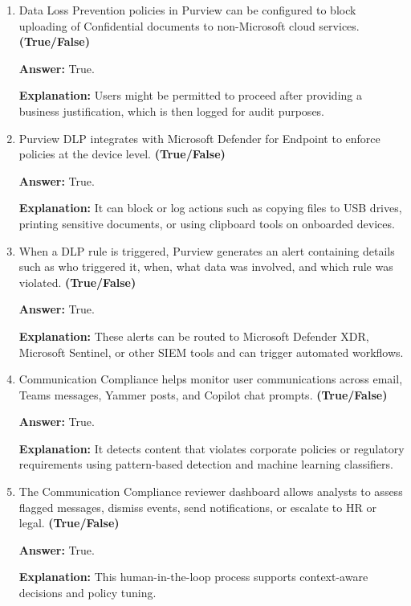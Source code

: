 \documentclass[10pt]{article}
\begin{document}
\begin{enumerate}[leftmargin=*]
\textbf{Answer:} True.

\textbf{Explanation:} The combination of HR context and data activity elevates risk scores and justifies further investigation during high-risk periods.

\item Data Loss Prevention policies in Purview can be configured to block uploading of Confidential documents to non-Microsoft cloud services. \textbf{(True/False)}

\textbf{Answer:} True.

\textbf{Explanation:} Users might be permitted to proceed after providing a business justification, which is then logged for audit purposes.

\item Purview DLP integrates with Microsoft Defender for Endpoint to enforce policies at the device level. \textbf{(True/False)}

\textbf{Answer:} True.

\textbf{Explanation:} It can block or log actions such as copying files to USB drives, printing sensitive documents, or using clipboard tools on onboarded devices.

\item When a DLP rule is triggered, Purview generates an alert containing details such as who triggered it, when, what data was involved, and which rule was violated. \textbf{(True/False)}

\textbf{Answer:} True.

\textbf{Explanation:} These alerts can be routed to Microsoft Defender XDR, Microsoft Sentinel, or other SIEM tools and can trigger automated workflows.

\item Communication Compliance helps monitor user communications across email, Teams messages, Yammer posts, and Copilot chat prompts. \textbf{(True/False)}

\textbf{Answer:} True.

\textbf{Explanation:} It detects content that violates corporate policies or regulatory requirements using pattern-based detection and machine learning classifiers.

\item The Communication Compliance reviewer dashboard allows analysts to assess flagged messages, dismiss events, send notifications, or escalate to HR or legal. \textbf{(True/False)}

\textbf{Answer:} True.

\textbf{Explanation:} This human-in-the-loop process supports context-aware decisions and policy tuning.


\end{enumerate}
\end{document}
